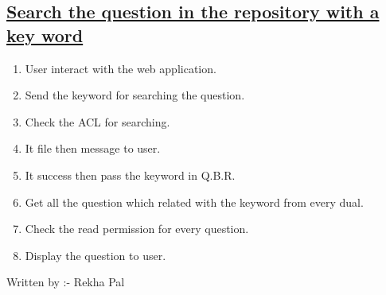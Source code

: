 \documentclass{article}
\begin{document}
\subsection*{\underline{Search the question in the repository with a key word}}
\begin{enumerate}
\item User interact with the web application. 
\item Send the keyword for searching the question. 
\item Check the ACL for searching. 
\item It file then message to user. 
\item It success then pass the keyword in Q.B.R. 
\item Get all the question which related with the keyword from every dual. 
\item Check the read permission for every question. 
\item Display the question to user.
\begin{center}

\label{figure:searchthequestionintherep.latex}
\end{center}
\end{enumerate}

                                             Written by :- Rekha Pal  
\end{document}
